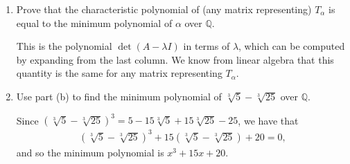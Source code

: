 \documentclass[12pt]{article}
\newcommand{\QQ}{\mathbb{Q}}
\DeclareMathOperator{\tr}{tr}
\begin{document}
\begin{enumerate}
\begin{enumerate}
\begin{align*}
\begin{array}{ccccc}
                        0 & 1 & 0 & \cdots & -a_2 \\
                        \vdots & \vdots & \ddots & \cdots & \vdots \\
                        0 & 0 & \cdots & 1 & -a_{n - 1}
                    \end{array} \right].
                \end{align*}
                From Vieta's formulas, $\tr T_\alpha = -a_{n - 1} = -(-\alpha_1 - \cdots - \alpha_n) = \alpha_1 + \cdots + \alpha_n$. Also, $\det T_\alpha = (-1)^{n - 1}(-a_0) = (-1)^n (-1)^n \alpha_1 \cdots \alpha_n = \alpha_1 \cdots \alpha_n$.
            \item
                Prove that the characteristic polynomial of (any matrix representing) $T_\alpha$ is equal to the minimum polynomial of $\alpha$ over $\QQ$. \par
                This is the polynomial $\det(A - \lambda I)$ in terms of $\lambda$, which can be computed by expanding from the last column. We know from linear algebra that this quantity is the same for any matrix representing $T_\alpha$.
            \item
                Use part (b) to find the minimum polynomial of $\sqrt[3]{5} - \sqrt[3]{25}$ over $\QQ$. \par
                Since $(\sqrt[3]{5} - \sqrt[3]{25})^3 = 5 - 15\sqrt[3]{5} + 15\sqrt[3]{25} - 25$, we have that
                \begin{align*}
                    (\sqrt[3]{5} - \sqrt[3]{25})^3 + 15(\sqrt[3]{5} - \sqrt[3]{25}) + 20 = 0,
                \end{align*}
                and so the minimum polynomial is $x^3 + 15x + 20$.
        \end{enumerate}
\end{enumerate}
\end{document}
